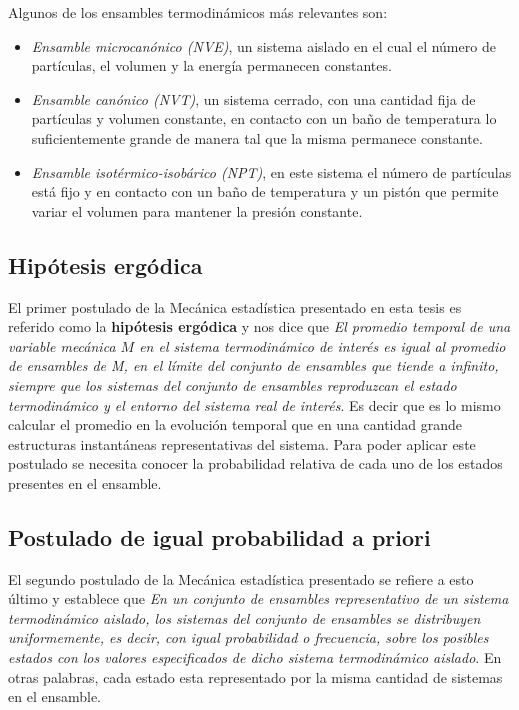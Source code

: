 Algunos de los ensambles termodinámicos más relevantes son:
\begin{itemize}
    \item \textit{Ensamble microcanónico (NVE)}, un sistema aislado en el cual el 
        número de partículas, el volumen y la energía permanecen constantes.
    \item \textit{Ensamble canónico (NVT)}, un sistema cerrado, con una cantidad
        fija de partículas y volumen constante, en contacto con un baño de 
        temperatura lo suficientemente grande de manera tal que la misma permanece 
        constante.
    \item \textit{Ensamble isotérmico-isobárico (NPT)}, en este sistema el número
        de partículas está fijo y en contacto con un baño de temperatura y un
        pistón que permite variar el volumen para mantener la presión constante.
\end{itemize}

\subsection{Hipótesis ergódica}

El primer postulado de la Mecánica estadística presentado en esta tesis es 
referido como la \textbf{hipótesis ergódica} y nos dice que \textit{El promedio 
temporal de una variable mecánica $M$ en el sistema termodinámico de interés es 
igual al promedio de ensambles de M, en el límite del conjunto de ensambles que 
tiende a infinito, siempre que los sistemas del conjunto de ensambles reproduzcan 
el estado termodinámico y el entorno del sistema real de interés}. Es decir que
es lo mismo calcular el promedio en la evolución temporal que en una cantidad 
grande estructuras instantáneas representativas del sistema. Para poder aplicar
este postulado se necesita conocer la probabilidad relativa de cada uno de los 
estados presentes en el ensamble.

\subsection{Postulado de igual probabilidad a priori}

El segundo postulado de la Mecánica estadística presentado se refiere a esto
último y establece que \textit{En un conjunto de ensambles representativo de un 
sistema termodinámico aislado, los sistemas del conjunto de ensambles se distribuyen 
uniformemente, es decir, con igual probabilidad o frecuencia, sobre los posibles 
estados con los valores especificados de dicho sistema termodinámico aislado}.
En otras palabras, cada estado esta representado por la misma cantidad de sistemas
en el ensamble.


